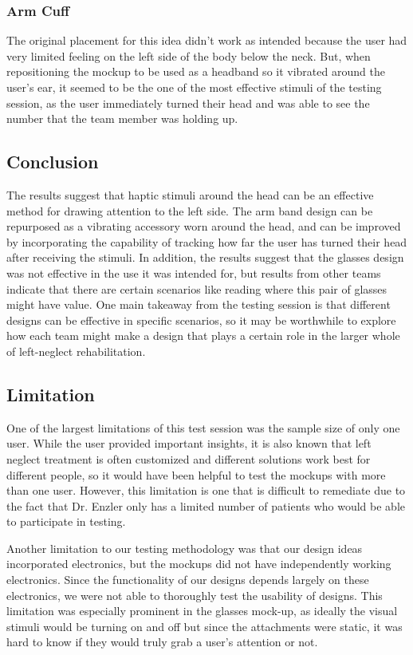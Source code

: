 \subsubsection{Arm Cuff}

The original placement for this idea didn’t work as intended because the user
had very limited feeling on the left side of the body below the neck. But, when
repositioning the mockup to be used as a headband so it vibrated around the
user’s ear, it seemed to be the one of the most effective stimuli of the
testing session, as the user immediately turned their head and was able to see
the number that the team member was holding up.

\subsection{Conclusion}

The results suggest that haptic stimuli around the head can be an effective
method for drawing attention to the left side. The arm band design can be
repurposed as a vibrating accessory worn around the head, and can be improved
by incorporating the capability of tracking how far the user has turned their
head after receiving the stimuli. In addition, the results suggest that the
glasses design was not effective in the use it was intended for, but results
from other teams indicate that there are certain scenarios like reading where
this pair of glasses might have value. One main takeaway from the testing
session is that different designs can be effective in specific scenarios, so it
may be worthwhile to explore how each team might make a design that plays a
certain role in the larger whole of left-neglect rehabilitation.

\subsection{Limitation}

One of the largest limitations of this test session was the sample size of only
one user. While the user provided important insights, it is also known that
left neglect treatment is often customized and different solutions work best
for different people, so it would have been helpful to test the mockups with
more than one user. However, this limitation is one that is difficult to
remediate due to the fact that Dr. Enzler only has a limited number of patients
who would be able to participate in testing.

Another limitation to our testing methodology was that our design ideas
incorporated electronics, but the mockups did not have independently working
electronics. Since the functionality of our designs depends largely on these
electronics, we were not able to thoroughly test the usability of designs. This
limitation was especially prominent in the glasses mock-up, as ideally the
visual stimuli would be turning on and off but since the attachments were
static, it was hard to know if they would truly grab a user’s attention or
not.



